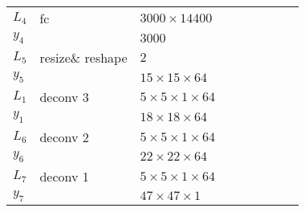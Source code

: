 \begin{table}[h!]
{\begin{tabular}{|lllllllll|}
\multicolumn{1}{|l|}{$L_4$}   & fc       & \multicolumn{1}{l|}{$3000\times 14400$}              &          & \multicolumn{1}{l|}{}        \\
\multicolumn{1}{|l|}{$y_4$}   &          & \multicolumn{1}{l|}{$3000$}                         &          & \multicolumn{1}{l|}{}        \\ \hline

\multicolumn{1}{|l|}{$L_5$}   & resize\& reshape & \multicolumn{1}{l|}{$2$}                    &          & \multicolumn{1}{l|}{}        \\
\multicolumn{1}{|l|}{$y_5$}   &          & \multicolumn{1}{l|}{$15\times15\times 64$}          &          & \multicolumn{1}{l|}{}        \\ \hline

\multicolumn{1}{|l|}{$L_1$}   & deconv 3   & \multicolumn{1}{l|}{$5\times 5\times1\times 64$}    &          & \multicolumn{1}{l|}{}\\
\multicolumn{1}{|l|}{$y_1$}   &          & \multicolumn{1}{l|}{$18\times18\times64$}           &          & \multicolumn{1}{l|}{}        \\ \hline

\multicolumn{1}{|l|}{$L_6$}   & deconv 2   & \multicolumn{1}{l|}{$5\times 5\times1\times 64$}    &          & \multicolumn{1}{l|}{}\\
\multicolumn{1}{|l|}{$y_6$}   &          & \multicolumn{1}{l|}{$22\times22\times64$}           &          & \multicolumn{1}{l|}{}        \\ \hline


\multicolumn{1}{|l|}{$L_7$}   & deconv 1   & \multicolumn{1}{l|}{$5\times 5\times1\times 64$}    &          & \multicolumn{1}{l|}{}\\
\multicolumn{1}{|l|}{$y_7$}   &          & \multicolumn{1}{l|}{$47\times47\times1$}           &          & \multicolumn{1}{l|}{}        \\ \hline
\end{tabular}
\caption{} \label{net:2}
}
\end{table}
